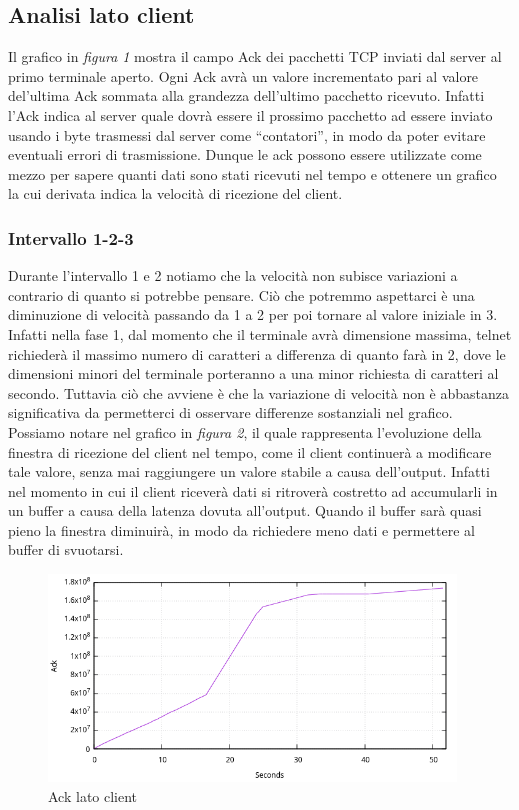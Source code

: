 \documentclass[12pt]{article}
\begin{document}
\subsection{Analisi lato client}
Il grafico in \textit{figura 1} mostra il campo Ack dei pacchetti TCP inviati dal server al primo terminale aperto.
Ogni Ack avrà un valore incrementato pari al valore del’ultima Ack sommata alla grandezza dell’ultimo pacchetto ricevuto. Infatti l’Ack indica al server quale dovrà essere il prossimo pacchetto ad essere inviato usando i byte trasmessi dal server come “contatori”, in modo da poter evitare eventuali errori di trasmissione.
Dunque le ack possono essere utilizzate come mezzo per sapere quanti dati sono stati ricevuti nel tempo e ottenere un grafico la cui derivata indica la velocità di ricezione del client.

\subsubsection{Intervallo 1-2-3}	
Durante l’intervallo 1 e 2 notiamo che la velocità non subisce variazioni a contrario di quanto si potrebbe pensare. Ciò che potremmo aspettarci è una diminuzione di velocità passando da 1 a 2 per poi tornare al valore iniziale in 3. \\Infatti nella fase 1, dal momento che il terminale avrà dimensione massima, telnet richiederà il massimo numero di caratteri a differenza di quanto farà in 2, dove le dimensioni minori del terminale porteranno a una minor richiesta di caratteri al secondo. Tuttavia ciò che avviene è che la variazione di velocità non è abbastanza significativa da permetterci di osservare differenze sostanziali nel grafico. Possiamo notare nel grafico in \textit{figura 2}, il quale rappresenta l’evoluzione della finestra di ricezione del client nel tempo, come il client continuerà a modificare tale valore, senza mai raggiungere un valore stabile a causa dell'output. Infatti nel momento in cui il client riceverà dati si ritroverà costretto ad accumularli in un buffer a causa della latenza dovuta all'output. Quando il buffer sarà quasi pieno la finestra diminuirà, in modo da richiedere meno dati e permettere al buffer di svuotarsi.\\

\begin{figure}[h]
  \includegraphics[height=5.5cm]{client_ack_lines.png}
  \centering
  \caption{Ack lato client}
  \label{client_ack}
\end{figure}
\end{document}
